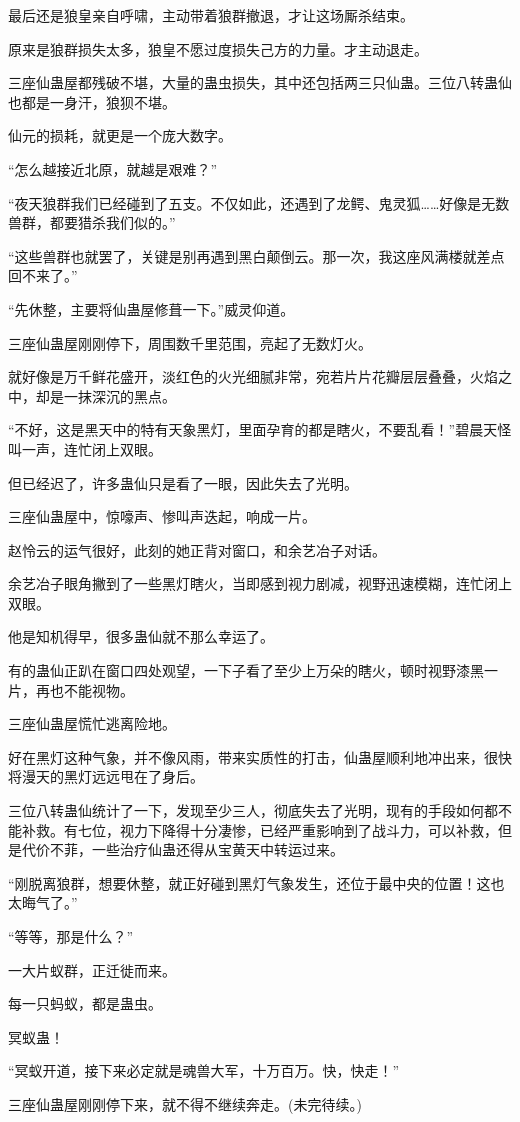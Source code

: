 \begin{this_body}
最后还是狼皇亲自呼啸，主动带着狼群撤退，才让这场厮杀结束。

原来是狼群损失太多，狼皇不愿过度损失己方的力量。才主动退走。

三座仙蛊屋都残破不堪，大量的蛊虫损失，其中还包括两三只仙蛊。三位八转蛊仙也都是一身汗，狼狈不堪。

仙元的损耗，就更是一个庞大数字。

“怎么越接近北原，就越是艰难？”

“夜天狼群我们已经碰到了五支。不仅如此，还遇到了龙鳄、鬼灵狐……好像是无数兽群，都要猎杀我们似的。”

“这些兽群也就罢了，关键是别再遇到黑白颠倒云。那一次，我这座风满楼就差点回不来了。”

“先休整，主要将仙蛊屋修葺一下。”威灵仰道。

三座仙蛊屋刚刚停下，周围数千里范围，亮起了无数灯火。

就好像是万千鲜花盛开，淡红色的火光细腻非常，宛若片片花瓣层层叠叠，火焰之中，却是一抹深沉的黑点。

“不好，这是黑天中的特有天象黑灯，里面孕育的都是瞎火，不要乱看！”碧晨天怪叫一声，连忙闭上双眼。

但已经迟了，许多蛊仙只是看了一眼，因此失去了光明。

三座仙蛊屋中，惊嚎声、惨叫声迭起，响成一片。

赵怜云的运气很好，此刻的她正背对窗口，和余艺冶子对话。

余艺冶子眼角撇到了一些黑灯瞎火，当即感到视力剧减，视野迅速模糊，连忙闭上双眼。

他是知机得早，很多蛊仙就不那么幸运了。

有的蛊仙正趴在窗口四处观望，一下子看了至少上万朵的瞎火，顿时视野漆黑一片，再也不能视物。

三座仙蛊屋慌忙逃离险地。

好在黑灯这种气象，并不像风雨，带来实质性的打击，仙蛊屋顺利地冲出来，很快将漫天的黑灯远远甩在了身后。

三位八转蛊仙统计了一下，发现至少三人，彻底失去了光明，现有的手段如何都不能补救。有七位，视力下降得十分凄惨，已经严重影响到了战斗力，可以补救，但是代价不菲，一些治疗仙蛊还得从宝黄天中转运过来。

“刚脱离狼群，想要休整，就正好碰到黑灯气象发生，还位于最中央的位置！这也太晦气了。”

“等等，那是什么？”

一大片蚁群，正迁徙而来。

每一只蚂蚁，都是蛊虫。

冥蚁蛊！

“冥蚁开道，接下来必定就是魂兽大军，十万百万。快，快走！”

三座仙蛊屋刚刚停下来，就不得不继续奔走。(未完待续。)

\end{this_body}

